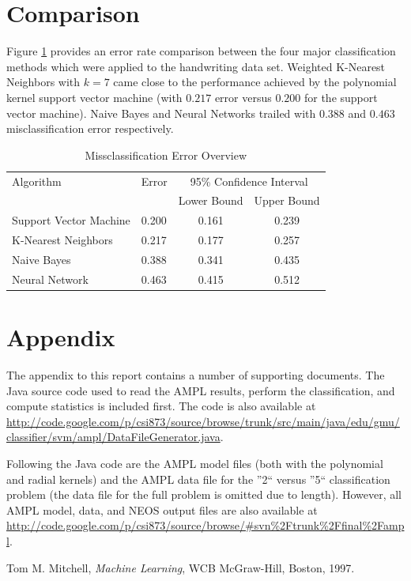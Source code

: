 \documentclass{article}
\begin{document}
\section{Comparison}\label{Comparison}

Figure \ref{error3} provides an error rate comparison between the four major classification methods which were applied to the handwriting data set. Weighted K-Nearest Neighbors with \(k=7\) came close to the performance achieved by the polynomial kernel support vector machine (with \(0.217\) error versus \(0.200\) for the support vector machine). Naive Bayes and Neural Networks trailed with \(0.388\) and \(0.463\) misclassification error respectively.

\begin{table}
\caption{Missclassification Error Overview}
\begin{center}
\begin{tabular}{llcc}
\toprule
Algorithm & Error & \multicolumn{2}{c}{95\% Confidence Interval} \\
\cmidrule(r){3-4}
& & Lower Bound & Upper Bound \\
\midrule
Support Vector Machine & 0.200 & 0.161 & 0.239 \\
K-Nearest Neighbors & 0.217 & 0.177 & 0.257 \\
Naive Bayes & 0.388 &  0.341 & 0.435  \\
Neural Network & 0.463 &  0.415 & 0.512  \\
\bottomrule
\end{tabular}
\label{error3}
\end{center}
\end{table}

\section{Appendix}\label{Appendix}

The appendix to this report contains a number of supporting documents. The Java source code used to read the AMPL results, perform the classification, and compute statistics is included first. The code is also available at \url{http://code.google.com/p/csi873/source/browse/trunk/src/main/java/edu/gmu/classifier/svm/ampl/DataFileGenerator.java}.

Following the Java code are the AMPL model files (both with the polynomial and radial kernels) and the AMPL data file for the ''2`` versus ''5`` classification problem (the data file for the full problem is omitted due to length). However, all AMPL model, data, and NEOS output files are also available at \url{http://code.google.com/p/csi873/source/browse/#svn\%2Ftrunk\%2Ffinal\%2Fampl}.

\begin{thebibliography}{9}

  Tom M. Mitchell,
  \emph{Machine Learning},
  WCB McGraw-Hill, Boston,
  1997.

\end{thebibliography}
\end{document}
